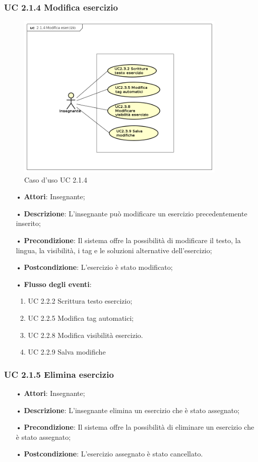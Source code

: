 \subsubsection{UC 2.1.4 Modifica esercizio}

\begin{figure}[H]
\centering
\includegraphics[width=10cm]{img/UC214.png} 
\caption{Caso d'uso UC 2.1.4}
\end{figure}

\begin{itemize}
	\item[•] \textbf{Attori}: Insegnante;
	\item[•] \textbf{Descrizione}: L’insegnante può modificare un esercizio precedentemente inserito;
	\item[•] \textbf{Precondizione}: Il sistema offre la possibilità di modificare il testo, la
				lingua, la visibilità, i {tag} e le soluzioni alternative 
				dell’esercizio;
	\item[•] \textbf{Postcondizione}: L’esercizio è stato modificato;
	\item[•] \textbf{Flusso degli eventi}:
		\begin{enumerate}
			\item UC 2.2.2 Scrittura testo esercizio;
			\item UC 2.2.5 Modifica tag automatici;
			\item UC 2.2.8 Modifica visibilità esercizio.
			\item UC 2.2.9 Salva modifiche
		\end{enumerate}
		    
\end{itemize}   	
	
\subsubsection{UC 2.1.5 Elimina esercizio}
\begin{itemize}
	\item[•] \textbf{Attori}: Insegnante;
	\item[•] \textbf{Descrizione}: L’insegnante elimina un esercizio che è stato assegnato;
	\item[•] \textbf{Precondizione}: Il sistema offre la possibilità di eliminare un esercizio che è stato assegnato;
	\item[•] \textbf{Postcondizione}: L’esercizio assegnato è stato cancellato.
\end{itemize}

